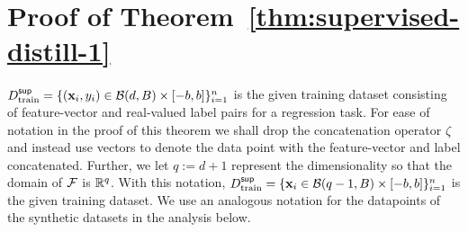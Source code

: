 \section{Proof of Theorem~\ref{thm:supervised-distill-1}}\label{sec:Mainpfthm1}
 $D^{\sf sup}_{\textnormal{train}} = \{({\mathbf{x}}_i, y_i) \in \mathcal{B}(d, B) \times [-b, b]\}_{i=1}^n$ is the given training dataset consisting of feature-vector and real-valued label pairs for a regression task. 
 For ease of notation in the proof of this theorem we shall drop the concatenation operator $\zeta$ and instead use vectors to denote the data point with the feature-vector and label concatenated. Further, we let $q := d+1$ represent the dimensionality so that the domain of $\mathcal{F}$ is $\mathbb{R}^q$. With this notation,  $D^{\sf sup}_{\textnormal{train}} = \{{\mathbf{x}}_i \in \mathcal{B}(q-1,B)\times [-b,b]\}_{i=1}^n$ is the given training dataset. We use an analogous notation for the datapoints of the synthetic datasets in the analysis below.
 
